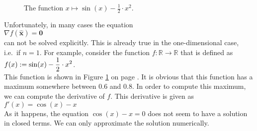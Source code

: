 \begin{figure}[!th]
\centering
{}
\vspace*{-0.3cm}
\caption{The function $x \mapsto \sin(x) - \frac{1}{2} \cdot x^2$.}
\label{fig:sin-minus-square.eps}
\end{figure}

\noindent
Unfortunately, in many cases the equation 
\\[0.2cm]
\hspace*{1.3cm}
$\nabla f(\mathbf{\widehat{x}}) = \mathbf{0}$
\\[0.2cm]
can not be solved explicitly.  This is already true in the one-dimensional case, i.e.~if $n=1$.  For example, consider
the function $f:\mathbb{R} \rightarrow \mathbb{R}$ that is defined as
\\[0.2cm]
\hspace*{1.3cm}
$\displaystyle f(x) := \sin(x) - \frac{1}{2} \cdot x^2$.
\\[0.2cm]
This function is shown in Figure \ref{fig:sin-minus-square.eps} on page \pageref{fig:sin-minus-square.eps}.
It is obvious that this function has a maximum somewhere between $0.6$ and $0.8$.  In order to compute this maximum, we
can compute the derivative of $f$.   This derivative is given as 
\\[0.2cm]
\hspace*{1.3cm}
$f'(x) = \cos(x) - x$
\\[0.2cm]
As it happens, the equation $\cos(x) - x = 0$ does not seem to have a solution in closed terms.  We can only approximate
the solution numerically.


